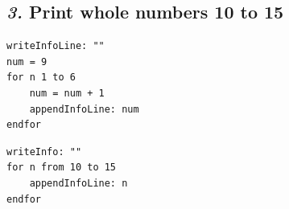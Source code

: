 \documentclass[12pt, english]{article}
\begin{document}
\subsection*{\emph{3.} Print whole numbers 10 to 15}

\begin{lstlisting}
writeInfoLine: ""
num = 9
for n 1 to 6
    num = num + 1
    appendInfoLine: num
endfor
\end{lstlisting}

\begin{lstlisting}[rulesepcolor=\color{blue}]
writeInfo: ""
for n from 10 to 15
    appendInfoLine: n
endfor
\end{lstlisting}

\vspace{10pt}

\end{document}
